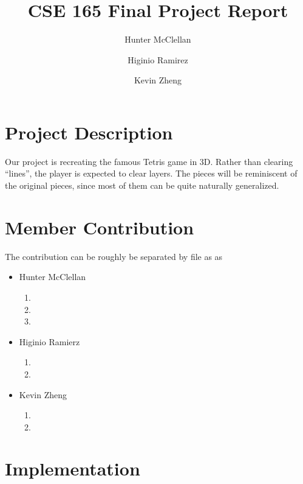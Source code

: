 \documentclass[letterpaper, 12pt]{article}
\title{CSE 165 Final Project Report}
\author{Hunter McClellan \and Higinio Ramirez \and Kevin Zheng}
\begin{document}
\maketitle
\section{Project Description}
Our project is recreating the famous Tetris game in 3D.
Rather than clearing ``lines'', the player is expected to clear layers.
The pieces will be reminiscent of the original pieces, since most of them can be quite naturally generalized.
\section{Member Contribution}
The contribution can be roughly be separated by file as as
\begin{multicols}{3}

\begin{itemize}
    \item Hunter McClellan
        \begin{enumerate}
            \item {}
            \item {}
            \item {}
        \end{enumerate}
    \columnbreak
    \item Higinio Ramierz
        \begin{enumerate}
            \item {}
            \item {}
        \end{enumerate}
    \columnbreak
    \item Kevin Zheng
        \begin{enumerate}
            \item {}
            \item {}
        \end{enumerate}
\end{itemize}
\end{multicols}
\section{Implementation}
\end{document}
